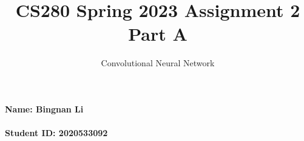 \documentclass[12pt]{article}%
\begin{document}
    \title{CS280 Spring 2023 Assignment 2 \\ Part A}
    \author{Convolutional Neural Network}
    \maketitle

    \paragraph{Name: Bingnan Li}

    \paragraph{Student ID: 2020533092}

    \newpage
\end{document}
